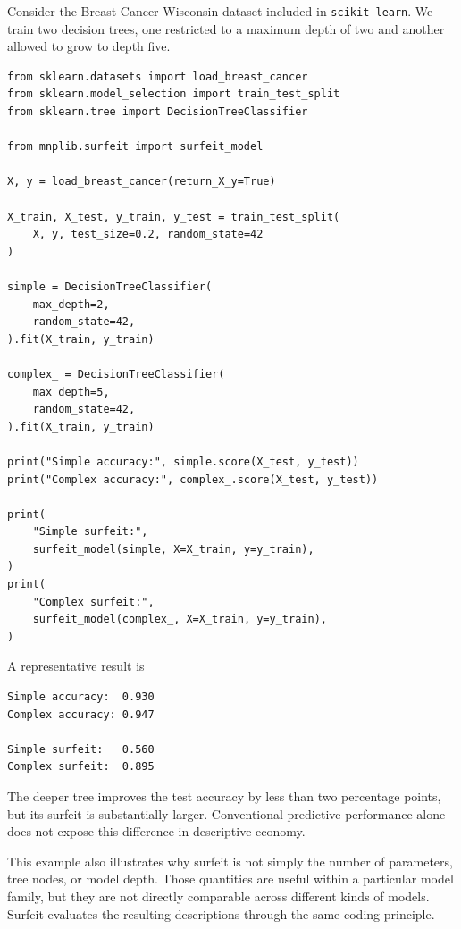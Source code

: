 \begin{example}
\label{ex:machine_learning:surfeit:same_family}

Consider the Breast Cancer Wisconsin dataset included in \texttt{scikit-learn}. We train two decision trees, one restricted to a maximum depth of two and another allowed to grow to depth five.

\begin{sourcecode}
{\scriptsize
\begin{verbatim}
from sklearn.datasets import load_breast_cancer
from sklearn.model_selection import train_test_split
from sklearn.tree import DecisionTreeClassifier

from mnplib.surfeit import surfeit_model

X, y = load_breast_cancer(return_X_y=True)

X_train, X_test, y_train, y_test = train_test_split(
    X, y, test_size=0.2, random_state=42
)

simple = DecisionTreeClassifier(
    max_depth=2,
    random_state=42,
).fit(X_train, y_train)

complex_ = DecisionTreeClassifier(
    max_depth=5,
    random_state=42,
).fit(X_train, y_train)

print("Simple accuracy:", simple.score(X_test, y_test))
print("Complex accuracy:", complex_.score(X_test, y_test))

print(
    "Simple surfeit:",
    surfeit_model(simple, X=X_train, y=y_train),
)
print(
    "Complex surfeit:",
    surfeit_model(complex_, X=X_train, y=y_train),
)
\end{verbatim}}
\end{sourcecode}

A representative result is

\begin{sourcecode}
{\scriptsize
\begin{verbatim}
Simple accuracy:  0.930
Complex accuracy: 0.947

Simple surfeit:   0.560
Complex surfeit:  0.895
\end{verbatim}}
\end{sourcecode}

The deeper tree improves the test accuracy by less than two percentage points, but its surfeit is substantially larger. Conventional predictive performance alone does not expose this difference in descriptive economy.
\end{example}

This example also illustrates why surfeit is not simply the number of parameters, tree nodes, or model depth. Those quantities are useful within a particular model family, but they are not directly comparable across different kinds of models. Surfeit evaluates the resulting descriptions through the same coding principle.

